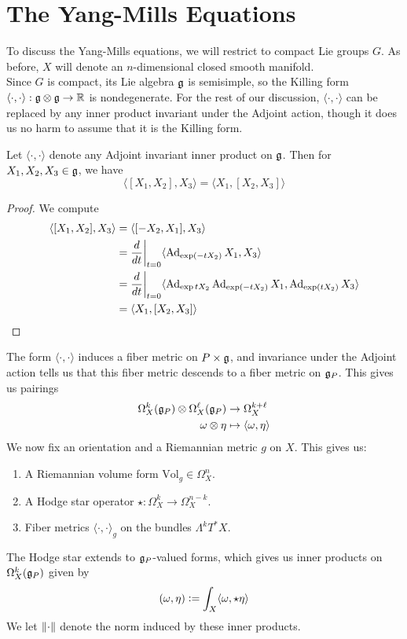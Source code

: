 %
\section{The Yang-Mills Equations}
%
To discuss the Yang-Mills equations, we will restrict to compact Lie groups
$G$. As before, $X$ will denote an $n$-dimensional closed smooth manifold. \\

Since $G$ is compact, its Lie algebra $\mathfrak{g}$ is semisimple, so the Killing
form $\langle\cdot,\cdot\rangle : \mathfrak{g} \otimes \mathfrak{g} \to \mathbb{R}$ is nondegenerate.
For the rest of our discussion, $\langle\cdot,\cdot\rangle$ can be replaced by
any inner product invariant under the Adjoint action, though it does us no
harm to assume that it is the Killing form.
%
\begin{lem}
Let $\langle\cdot,\cdot\rangle$ denote any Adjoint invariant inner product on $\mathfrak{g}$.
Then for $X_1,X_2,X_3 \in \mathfrak{g}$, we have
\[
\langle[X_1,X_2],X_3\rangle = \langle X_1,[X_2,X_3]\rangle
\]
\end{lem}
%
\begin{proof}
We compute
\begin{align*}
\langle[X_1,X_2],X_3\rangle &= \langle[-X_2,X_1],X_3\rangle \\
&= \frac{d}{dt}\bigg\vert_{t=0}\langle\operatorname{Ad}_{\exp(-tX_2)}X_1,X_3\rangle \\
&= \frac{d}{dt}\bigg\vert_{t=0}
\langle\operatorname{Ad}_{\exp{tX_2}}\operatorname{Ad}_{\exp(-tX_2)}X_1,\operatorname{Ad}_{\exp(tX_2)}X_3\rangle \\
&= \langle X_1,[X_2,X_3]\rangle
\end{align*}
\end{proof}
%
The form $\langle\cdot,\cdot\rangle$ induces a fiber metric on
$P \times \mathfrak{g}$, and invariance under the Adjoint action tells us that
this fiber metric descends to a fiber metric on $\mathfrak{g}_P$. This gives
us pairings
\begin{align*}
\Omega^k_X(\mathfrak{g}_P) \otimes \Omega^\ell_X(\mathfrak{g}_P) &\to \Omega^{k+\ell}_X \\
\omega \otimes \eta &\mapsto \langle\omega,\eta\rangle
\end{align*}
We now fix an orientation and a Riemannian metric $g$ on $X$. This gives us:
\begin{enumerate}
  \item A Riemannian volume form $\mathrm{Vol}_g \in \Omega^n_X$.
  \item A Hodge star operator $\star : \Omega^k_X \to \Omega^{n-k}_X$.
  \item Fiber metrics $\langle\cdot,\cdot\rangle_g$ on the bundles
  $\Lambda^kT^*X$.
\end{enumerate}
%
The Hodge star extends to $\mathfrak{g}_P$-valued forms, which gives us inner products
on $\Omega^k_X(\mathfrak{g}_P)$ given by
\[
(\omega,\eta) \vcentcolon= \int_X \langle\omega,\star\eta\rangle
\]
We let $\left\lVert\cdot\right\rVert$ denote the norm induced by these inner products. \\

